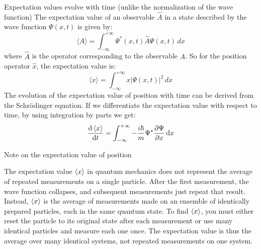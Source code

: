 \begin{frame}{Expectation values evolve with time (unlike the normalization of the wave function)}
		The expectation value of an observable $\hat{A}$ in a state described by the wave function $\Psi(x, t)$ is given by:
		\begin{equation*}
			\langle A \rangle = \int_{-\infty}^{+\infty} \Psi^*(x, t) \hat{A} \Psi(x, t) \, dx
		\end{equation*}
		where $\hat{A}$ is the operator corresponding to the observable $A$.
	So for the position operator $\hat{x}$, the expectation value is:
	\begin{equation*}
		\langle x \rangle = \int_{-\infty}^{+\infty} x |\Psi(x, t)|^2 \, dx
	\end{equation*}
	The evolution of the expectation value of position with time can be derived from the Schrödinger equation. If we differentiate the expectation value with respect to time, by using integration by parts we get:
\begin{equation*}
		\dv{\ev{x}}{t} = \int_{-\infty}^{+\infty} -\frac{i\hbar}{m} \Psi^* \pdv{\Psi}{x} \dd{x}
\end{equation*}

\end{frame}

\begin{frame}{Note on the expectation value of position}

The expectation value $\ev{x}$ in quantum mechanics does not represent the average of repeated measurements on a single particle. After the first measurement, the wave function collapses, and subsequent measurements just repeat that result. Instead, $\ev{x}$ is the average of measurements made on an ensemble of identically prepared particles, each in the same quantum state.
To find $\ev{x}$, you must either reset the particle to its original state after each measurement or use many identical particles and measure each one once. The expectation value is thus the average over many identical systems, not repeated measurements on one system.

\end{frame}

